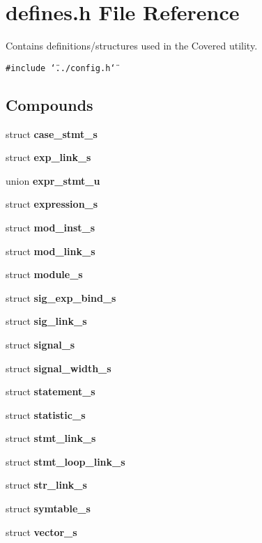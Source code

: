 \section{defines.h File Reference}
\label{defines_8h}
Contains definitions/structures used in the Covered utility. 


{\tt \#include \char`\"{}../config.h\char`\"{}}\par
\subsection*{Compounds}
\begin{CompactItemize}
\item 
struct {\bf case\_\-stmt\_\-s}
\item 
struct {\bf exp\_\-link\_\-s}
\item 
union {\bf expr\_\-stmt\_\-u}
\item 
struct {\bf expression\_\-s}
\item 
struct {\bf mod\_\-inst\_\-s}
\item 
struct {\bf mod\_\-link\_\-s}
\item 
struct {\bf module\_\-s}
\item 
struct {\bf sig\_\-exp\_\-bind\_\-s}
\item 
struct {\bf sig\_\-link\_\-s}
\item 
struct {\bf signal\_\-s}
\item 
struct {\bf signal\_\-width\_\-s}
\item 
struct {\bf statement\_\-s}
\item 
struct {\bf statistic\_\-s}
\item 
struct {\bf stmt\_\-link\_\-s}
\item 
struct {\bf stmt\_\-loop\_\-link\_\-s}
\item 
struct {\bf str\_\-link\_\-s}
\item 
struct {\bf symtable\_\-s}
\item 
struct {\bf vector\_\-s}
\end{CompactItemize}

